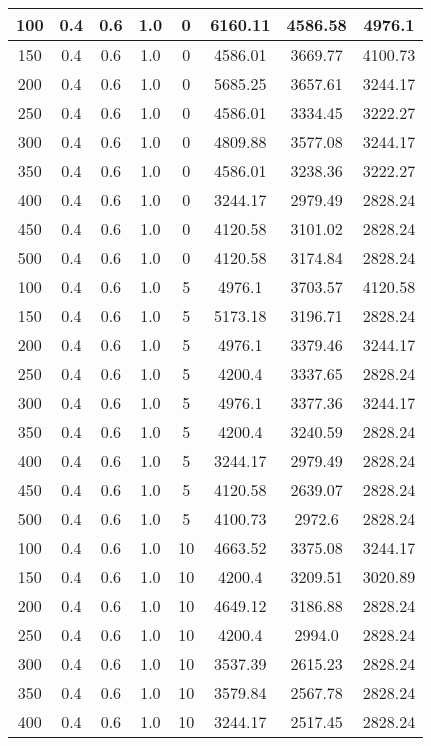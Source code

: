 \documentclass[a4paper, 12pt]{extreport}
\begin{document}
\begin{itemize}
\begin{longtable}{|c|c|c|c|c|c|c|c|}
			100 & 0.4 & 0.6 & 1.0 & 0 & 6160.11 & 4586.58 & 4976.1 \\\hline
			150 & 0.4 & 0.6 & 1.0 & 0 & 4586.01 & 3669.77 & 4100.73 \\\hline
			200 & 0.4 & 0.6 & 1.0 & 0 & 5685.25 & 3657.61 & 3244.17 \\\hline
			250 & 0.4 & 0.6 & 1.0 & 0 & 4586.01 & 3334.45 & 3222.27 \\\hline
			300 & 0.4 & 0.6 & 1.0 & 0 & 4809.88 & 3577.08 & 3244.17 \\\hline
			350 & 0.4 & 0.6 & 1.0 & 0 & 4586.01 & 3238.36 & 3222.27 \\\hline
			400 & 0.4 & 0.6 & 1.0 & 0 & 3244.17 & 2979.49 & 2828.24 \\\hline
			450 & 0.4 & 0.6 & 1.0 & 0 & 4120.58 & 3101.02 & 2828.24 \\\hline
			500 & 0.4 & 0.6 & 1.0 & 0 & 4120.58 & 3174.84 & 2828.24 \\\hline
			100 & 0.4 & 0.6 & 1.0 & 5 & 4976.1 & 3703.57 & 4120.58 \\\hline
			150 & 0.4 & 0.6 & 1.0 & 5 & 5173.18 & 3196.71 & 2828.24 \\\hline
			200 & 0.4 & 0.6 & 1.0 & 5 & 4976.1 & 3379.46 & 3244.17 \\\hline
			250 & 0.4 & 0.6 & 1.0 & 5 & 4200.4 & 3337.65 & 2828.24 \\\hline
			300 & 0.4 & 0.6 & 1.0 & 5 & 4976.1 & 3377.36 & 3244.17 \\\hline
			350 & 0.4 & 0.6 & 1.0 & 5 & 4200.4 & 3240.59 & 2828.24 \\\hline
			400 & 0.4 & 0.6 & 1.0 & 5 & 3244.17 & 2979.49 & 2828.24 \\\hline
			450 & 0.4 & 0.6 & 1.0 & 5 & 4120.58 & 2639.07 & 2828.24 \\\hline
			500 & 0.4 & 0.6 & 1.0 & 5 & 4100.73 & 2972.6 & 2828.24 \\\hline
			100 & 0.4 & 0.6 & 1.0 & 10 & 4663.52 & 3375.08 & 3244.17 \\\hline
			150 & 0.4 & 0.6 & 1.0 & 10 & 4200.4 & 3209.51 & 3020.89 \\\hline
			200 & 0.4 & 0.6 & 1.0 & 10 & 4649.12 & 3186.88 & 2828.24 \\\hline
			250 & 0.4 & 0.6 & 1.0 & 10 & 4200.4 & 2994.0 & 2828.24 \\\hline
			300 & 0.4 & 0.6 & 1.0 & 10 & 3537.39 & 2615.23 & 2828.24 \\\hline
			350 & 0.4 & 0.6 & 1.0 & 10 & 3579.84 & 2567.78 & 2828.24 \\\hline
			400 & 0.4 & 0.6 & 1.0 & 10 & 3244.17 & 2517.45 & 2828.24 \\\hline

\end{longtable}
\end{itemize}
\end{document}
